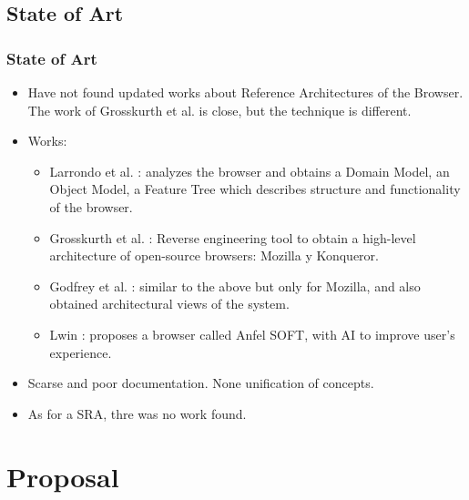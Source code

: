 \documentclass[serif,9pt]{beamer}
\begin{document}
\subsection{State of Art}
\begin{frame}
	\frametitle{State of Art}
	\begin{itemize}
		\item Have not found updated works about Reference Architectures of the Browser. The work of Grosskurth et al. \cite{preprint-grosskurth-browser-archevol} is close, but the technique is different.
		\item Works: 
		\begin{itemize}
			\item<1-> Larrondo et al. \cite{535061}: analyzes the browser and obtains a Domain Model,  an Object Model, a Feature Tree which describes structure and functionality of the browser.
			\item<2-> Grosskurth et al. \cite{2005-grosskurth-browser-refarch,preprint-grosskurth-browser-archevol}: Reverse engineering tool to obtain a high-level architecture of open-source browsers: Mozilla y Konqueror.
			\item<3-> Godfrey et al. \cite{Godfrey2000}: similar to the above but only for Mozilla, and also obtained architectural views of the system.
			\item<4-> Lwin \cite{Lwin2009}: proposes a browser called Anfel SOFT, with AI to improve user's experience.
		\end{itemize}
		\item<5-> Scarse and poor documentation. None unification of concepts.
		\item<5-> As for a SRA, thre was no work found.
	\end{itemize}
\end{frame}


\section{Proposal}
\end{document}
